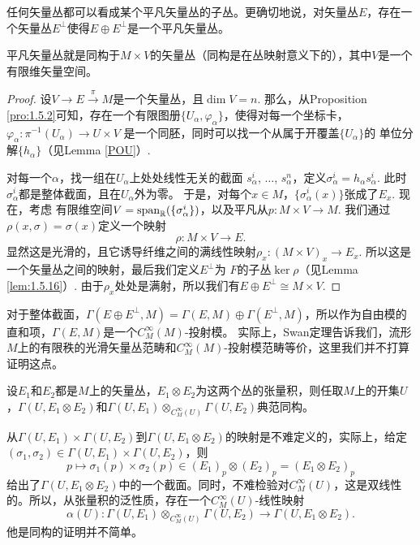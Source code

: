 \begin{pro}\label{pro:1.6.2}
	任何矢量丛都可以看成某个平凡矢量丛的子丛。更确切地说，对矢量丛$E$，存在一个矢量丛$E^\bot$使得$E\oplus E^\bot$是一个平凡矢量丛。
\end{pro}
		
平凡矢量丛就是同构于$M\times V$的矢量丛（同构是在丛映射意义下的），其中$V$是一个有限维矢量空间。

\begin{proof}
	设$V\to E\xrightarrow{\pi}M$是一个矢量丛，且$\dim V=n$. 
	那么，从Proposition \ref{pro:1.5.2}可知，存在一个有限图册$\{U_\alpha,\varphi_\alpha\}$，使得对每一个坐标卡，$\varphi_\alpha:\pi^{-1}(U_\alpha)\to U\times V$
	是一个同胚，同时可以找一个从属于开覆盖$\{U_{\alpha}\}$的
	单位分解$\{h_\alpha\}$（见Lemma \ref{POU}）.

	对每一个$\alpha$，找一组在$U_\alpha$上处处线性无关的截面
	$s_\alpha^i$, $\dots$, $s_\alpha^n$，定义$\sigma_\alpha^i=h_\alpha s_\alpha^i$. 此时$\sigma_\alpha^i$都是整体截面，且在$U_\alpha$外为零。
	于是，对每个$x\in M$，$\{\sigma_\alpha^i(x)\}$张成了$E_x$. 现在，考虑
	有限维空间$V=\operatorname{span}_{\mathbb{R}} (\{\sigma_\alpha^i\})$，以及平凡从$p:M\times V\to M$. 我们通过$\rho(x,\sigma)=\sigma(x)$定义一个映射
	\[
		\rho:M\times V\to E.
	\]
	显然这是光滑的，且它诱导纤维之间的满线性映射$\rho_x:(M\times V)_x\to E_x$. 所以这是一个矢量丛之间的映射，最后我们定义$E^\bot$为
	$F$的子丛$\ker \rho$（见Lemma \ref{lem:1.5.16}）. 由于$\rho_x$处处是满射，所以我们有$E\oplus E^\bot\cong M\times V$.
\end{proof}

对于整体截面，$\Gamma(E\oplus E^\bot,M)=\Gamma(E,M)\oplus \Gamma(E^\bot,M)$，所以作为自由模的直和项，$\Gamma(E,M)$是一个$C^\infty_M(M)$-投射模。
实际上，Swan定理告诉我们，流形$M$上的有限秩的光滑矢量丛范畴和$C^\infty_M(M)$-投射模范畴等价，这里我们并不打算证明这点。

\begin{thm}
	设$E_1$和$E_2$都是$M$上的矢量丛，$E_1\otimes E_2$为这两个丛的张量积，则任取$M$上的开集$U$，$\Gamma(U,E_1\otimes E_2)$和$\Gamma(U,E_1)\otimes_{C^{\infty}_M(U)} \Gamma(U,E_2)$典范同构。
\end{thm}
	
	从$\Gamma(U,E_1)\times \Gamma(U,E_2)$到$\Gamma(U,E_1\otimes E_2)$的映射是不难定义的，实际上，给定$(\sigma_1,\sigma_2)\in \Gamma(U,E_1)\times \Gamma(U,E_2)$，则
	\[
		p\mapsto \sigma_1(p)\times \sigma_2(p)\in (E_1)_p\otimes (E_2)_p=(E_1\otimes E_2)_p
	\]
	给出了$\Gamma(U,E_1\otimes E_2)$中的一个截面。同时，不难检验对$C^{\infty}_M(U)$，这是双线性的。所以，从张量积的泛性质，存在一个$C^{\infty}_M(U)$-线性映射
	\[
		\alpha(U):\Gamma(U,E_1)\otimes_{C^{\infty}_M(U)} \Gamma(U,E_2)\to \Gamma(U,E_1\otimes E_2).
	\]
	他是同构的证明并不简单。
	
